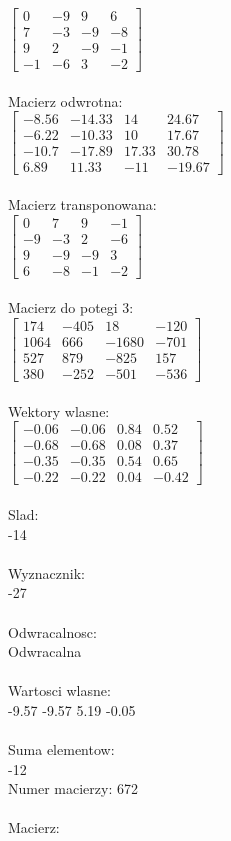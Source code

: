 \documentclass[a4paper,12pt]{article}
\begin{document}
$\begin{bmatrix} 0&-9&9&6\\7&-3&-9&-8\\9&2&-9&-1\\-1&-6&3&-2 \end{bmatrix}$
\\
\\
Macierz odwrotna:\\

$\begin{bmatrix} -8.56&-14.33&14&24.67\\-6.22&-10.33&10&17.67\\-10.7&-17.89&17.33&30.78\\6.89&11.33&-11&-19.67 \end{bmatrix}$
\\
\\
Macierz transponowana:\\

$\begin{bmatrix} 0&7&9&-1\\-9&-3&2&-6\\9&-9&-9&3\\6&-8&-1&-2 \end{bmatrix}$
\\
\\
Macierz do potegi 3:\\

$\begin{bmatrix} 174&-405&18&-120\\1064&666&-1680&-701\\527&879&-825&157\\380&-252&-501&-536 \end{bmatrix}$
\\
\\
Wektory wlasne:\\

$\begin{bmatrix} -0.06&-0.06&0.84&0.52\\-0.68&-0.68&0.08&0.37\\-0.35&-0.35&0.54&0.65\\-0.22&-0.22&0.04&-0.42 \end{bmatrix}$
\\
\\
Slad:\\
-14
\\
\\
Wyznacznik:\\
-27
\\
\\
Odwracalnosc:\\
Odwracalna
\\
\\
Wartosci wlasne:\\
-9.57 -9.57 5.19 -0.05
\\
\\
Suma elementow:\\
-12
\\
\newpage
Numer macierzy:
672
\\
\\
Macierz:\\
\end{document}
